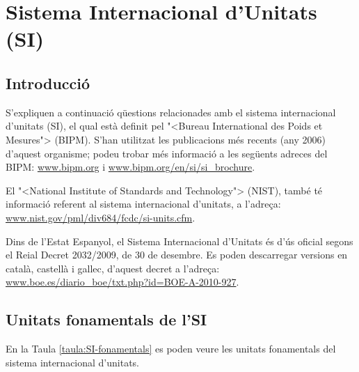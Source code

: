 \chapter{Sistema Internacional d'Unitats (SI)}\label{sec:SI}

\section{Introducci\'{o}}
S'expliquen a continuaci\'{o} q\"{u}estions relacionades amb el sistema
internacional d'unitats (SI), el qual est\`{a} definit pel {"<}Bureau
International des Poids et Mesures{">} (\textsf{BIPM}). S'han utilitzat les publicacions m\'{e}s recents (any 2006) d'aquest organisme; podeu trobar m\'{e}s informaci\'{o} a les seg\"{u}ents adreces del \textsf{BIPM}: \href{http://www.bipm.org/}{www.bipm.org} i
\href{http://www.bipm.org/en/si/si_brochure/}{www.bipm.org/en/si/si\_brochure}.

El {"<}National Institute of Standards and Technology{">} (\textsf{NIST}), tamb\'{e} t\'{e} informaci\'{o} referent al sistema
internacional d'unitats, a l'adre\c{c}a: \href{http://www.nist.gov/pml/div684/fcdc/si-units.cfm}
{www.nist.gov/pml/div684/fcdc/si-units.cfm}.

Dins de l'Estat Espanyol, el Sistema Internacional d'Unitats \'{e}s d'\'{u}s oficial segons el Reial Decret 2032/2009, de 30 de desembre. Es poden descarregar versions en catal\`{a}, castell\`{a} i gallec, d'aquest decret a l'adre\c{c}a: \href{http://www.boe.es/diario_boe/txt.php?id=BOE-A-2010-927}
{www.boe.es/diario\_boe/txt.php?id=BOE-A-2010-927}.


\section{Unitats fonamentals de l'SI}

En la Taula \vref{taula:SI-fonamentals} es poden veure les unitats
fonamentals del sistema internacional d'unitats.


